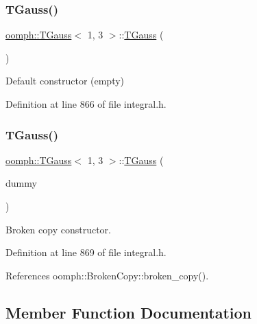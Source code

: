 \subsubsection{\texorpdfstring{T\+Gauss()}{TGauss()}\hspace{0.1cm}{\footnotesize\ttfamily [1/2]}}
{\footnotesize\ttfamily \hyperlink{classoomph_1_1TGauss}{oomph\+::\+T\+Gauss}$<$ 1, 3 $>$\+::\hyperlink{classoomph_1_1TGauss}{T\+Gauss} (\begin{DoxyParamCaption}{ }\end{DoxyParamCaption})\hspace{0.3cm}{\ttfamily [inline]}}



Default constructor (empty) 



Definition at line 866 of file integral.\+h.

\mbox{\label{classoomph_1_1TGauss_3_011_00_013_01_4_a348af5189d0513e1eb078dba22e68269}} 
\subsubsection{\texorpdfstring{T\+Gauss()}{TGauss()}\hspace{0.1cm}{\footnotesize\ttfamily [2/2]}}
{\footnotesize\ttfamily \hyperlink{classoomph_1_1TGauss}{oomph\+::\+T\+Gauss}$<$ 1, 3 $>$\+::\hyperlink{classoomph_1_1TGauss}{T\+Gauss} (\begin{DoxyParamCaption}\item[{const \hyperlink{classoomph_1_1TGauss}{T\+Gauss}$<$ 1, 3 $>$ \&}]{dummy }\end{DoxyParamCaption})\hspace{0.3cm}{\ttfamily [inline]}}



Broken copy constructor. 



Definition at line 869 of file integral.\+h.



References oomph\+::\+Broken\+Copy\+::broken\+\_\+copy().



\subsection{Member Function Documentation}
\mbox{\label{classoomph_1_1TGauss_3_011_00_013_01_4_a30aaa7dc15d55c0a9f36401888c25cd4}} 
